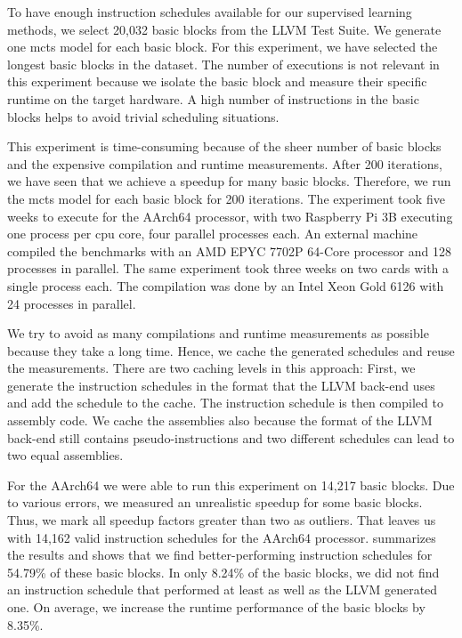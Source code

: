 
To have enough instruction schedules available for our supervised learning methods, we select 20,032 basic blocks from the LLVM Test Suite.
We generate one \ac{mcts} model for each basic block.
For this experiment, we have selected the longest basic blocks in the dataset.
The number of executions is not relevant in this experiment because we isolate the basic block and measure their specific runtime on the target hardware.
A high number of instructions in the basic blocks helps to avoid trivial scheduling situations.

This experiment is time-consuming because of the sheer number of basic blocks and the expensive compilation and runtime measurements.
After 200 iterations, we have seen that we achieve a speedup for many basic blocks.
Therefore, we run the \ac{mcts} model for each basic block for 200 iterations.
The experiment took five weeks to execute for the AArch64 processor, with two Raspberry Pi 3B executing one process per \ac{cpu} core, \ie four parallel processes each.
An external machine compiled the benchmarks with an AMD EPYC 7702P 64-Core processor and 128 processes in parallel.
The same experiment took three weeks on two \aurora{} cards with a single process each.
The compilation was done by an Intel Xeon Gold 6126 with 24 processes in parallel.


We try to avoid as many compilations and runtime measurements as possible because they take a long time.
Hence, we cache the generated schedules and reuse the measurements.
There are two caching levels in this approach:
First, we generate the instruction schedules in the format that the LLVM back-end uses and add the schedule to the cache.
The instruction schedule is then compiled to assembly code.
We cache the assemblies also because the format of the LLVM back-end still contains pseudo-instructions and two different schedules can lead to two equal assemblies.

For the AArch64 we were able to run this experiment on 14,217 basic blocks.
Due to various errors, we measured an unrealistic speedup for some basic blocks.
Thus, we mark all speedup factors greater than two as outliers.
That leaves us with 14,162 valid instruction schedules for the AArch64 processor.
 summarizes the results and shows that we find better-performing instruction schedules for 54.79\% of these basic blocks.
In only 8.24\% of the basic blocks, we did not find an instruction schedule that performed at least as well as the LLVM generated one.
On average, we increase the runtime performance of the basic blocks by 8.35\%.

